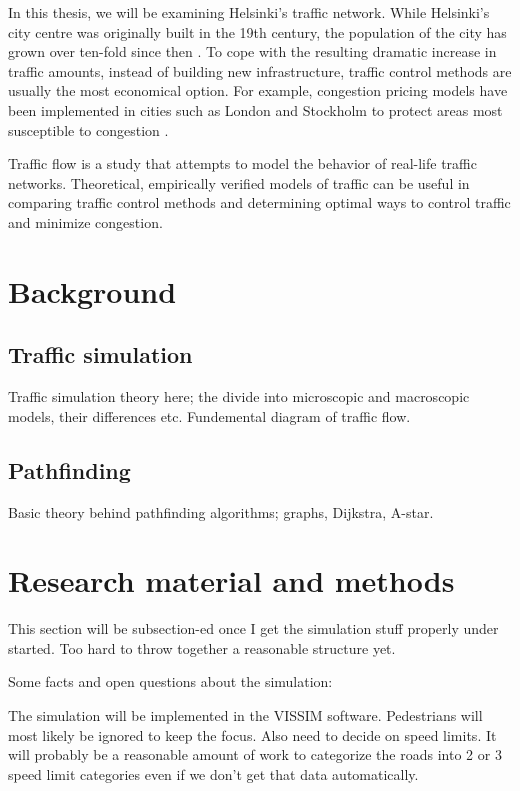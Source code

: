 \documentclass[english, 12pt, a4paper, elec, utf8, pdfa, online]{aaltothesis}
\begin{document}
In this thesis, we will be examining Helsinki's traffic network. While Helsinki's city centre was originally built in the 19th century, the population of the city has grown over ten-fold since then \cite{helsinki}. To cope with the resulting dramatic increase in traffic amounts, instead of building new infrastructure, traffic control methods are usually the most economical option. For example, congestion pricing models have been implemented in cities such as London and Stockholm to protect areas most susceptible to congestion \cite{congestionpricing}.

Traffic flow is a study that attempts to model the behavior of real-life traffic networks. Theoretical, empirically verified models of traffic can be useful in comparing traffic control methods and determining optimal ways to control traffic and minimize congestion.

\clearpage

\section{Background}

\subsection{Traffic simulation}

Traffic simulation theory here; the divide into microscopic and macroscopic models, their differences etc. Fundemental diagram of traffic flow.

\subsection{Pathfinding}

Basic theory behind pathfinding algorithms; graphs, Dijkstra, A-star.

\clearpage

\section{Research material and methods}

This section will be subsection-ed once I get the simulation stuff properly under started. Too hard to throw together a reasonable structure yet.

Some facts and open questions about the simulation:

The simulation will be implemented in the VISSIM software. Pedestrians will most likely be ignored to keep the focus. Also need to decide on speed limits. It will probably be a reasonable amount of work to categorize the roads into 2 or 3 speed limit categories even if we don't get that data automatically.
\end{document}
